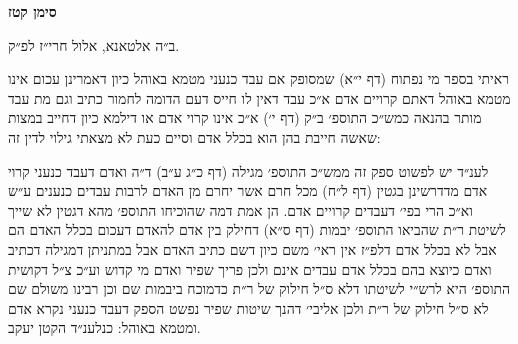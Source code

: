 \documentclass[12pt, openany]{book}
\newcommand{\chapname}{}
\newcommand{\newchap}[1]{
	\addcontentsline{toc}{chapter}{#1}
	\renewcommand{\chapname}{#1}
		\begin{center}
			\textbf{%
\fontsize{16pt}{16pt}\selectfont
				#1}
		\end{center}
}
\begin{document}
\newchap{סימן קטז}
\begin{multicols}{2}
ב״ה אלטאנא, אלול חרי״ז לפ״ק.\\\vspace{0pt}

ראיתי בספר מי נפתוח (דף י״א) שמסופק אם עבד כנעני מטמא באוהל כיון דאמרינן עכום אינו מטמא באוהל דאתם קרויים אדם א״כ עבד דאין לו חייס דעם הדומה לחמור כתיב וגם מת עבד מותר בהנאה כמש״כ התוספ׳ ב״ק (דף י׳) א״כ אינו קרוי אדם או דילמא כיון דחייב במצות שאשה חייבת בהן הוא בכלל אדם וסיים כעת לא מצאתי גילוי לדין זה:\\\vspace{0pt}

לענ״ד יש לפשוט ספק זה ממש״כ התוספ׳ מגילה (דף כ״ג ע״ב) ד״ה ואדם דעבד כנעני קרוי אדם מדדרשינן בגטין (דף ל״ח) מכל חרם אשר יחרם מן האדם לרבות עבדים כנענים ע״ש וא״כ הרי בפי׳ דעבדים קרויים אדם. הן אמת דמה שהוכיחו התוספ׳ מהא דגטין לא שייך לשיטת ר״ת שהביאו התוספ׳ יבמות (דף ס״א) דחילק בין אדם להאדם דעכום בכלל האדם הם אבל לא בכלל אדם דלפ״ז אין ראי׳ משם כיון דשם כתיב האדם אבל במתניתן דמגילה דכתיב ואדם כיוצא בהם בכלל אדם עבדים אינם ולכן פריך שפיר ואדם מי קדוש וע״כ צ״ל דקושית התוספ׳ היא לרש״י לשיטתו דלא ס״ל חילוק של ר״ת כדמוכח ביבמות שם וכן רבינו משולם שם לא ס״ל חילוק של ר״ת ולכן אליבי׳ דהנך שיטות שפיר נפשט הספק דעבד כנעני נקרא אדם ומטמא באוהל: כנלענ״ד הקטן יעקב.\\\vspace{0pt}

\end{multicols}\newpage
\end{document}

